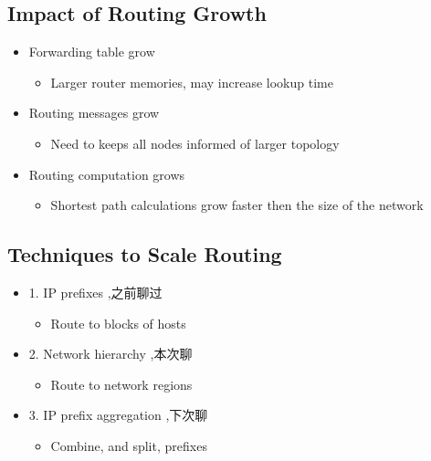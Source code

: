\documentclass[12pt]{ctexart}   %
\begin{document}
	\subsection{Impact of Routing Growth}
	\begin{itemize}
		\item Forwarding table grow
		\begin{itemize}
			\item Larger router memories, may increase lookup time
		\end{itemize}
		
		\item Routing messages grow
		\begin{itemize}
			\item Need to keeps all nodes informed of larger topology
		\end{itemize}
		
		\item Routing computation grows
		\begin{itemize}
			\item Shortest path calculations grow faster then the size of the network
		\end{itemize}
	\end{itemize}
	
	\subsection{Techniques to Scale Routing}
	\begin{itemize}
		\item {\color{blue} 1.} IP prefixes ,之前聊过
		\begin{itemize}
			\item Route to blocks of hosts
		\end{itemize}
		
		\item {\color{blue} 2.} Network hierarchy ,本次聊
		\begin{itemize}
			\item Route to network regions
		\end{itemize}
		
		\item {\color{blue} 3.} IP prefix aggregation  ,下次聊
		\begin{itemize}
			\item Combine, and split, prefixes 
		\end{itemize}
	\end{itemize}
	
\end{document}
